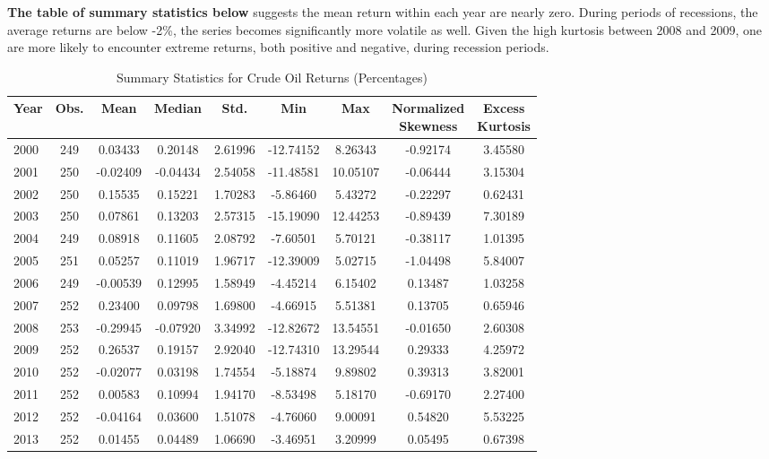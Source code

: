 \documentclass[12pt]{article}
\begin{document}
	\par \textbf{The table of summary statistics below} suggests the mean return within each year are nearly zero. During periods of recessions, the average returns are below -2\%, the series becomes significantly more volatile as well. Given the high kurtosis between 2008 and 2009, one are more likely to encounter extreme returns, both positive and negative, during recession periods.
	\begin{table}[H]
		\small
		\centering
		\caption{Summary Statistics for Crude Oil Returns (Percentages)}
		\begin{tabular}{l|c c c c c c c c}
			\toprule
Year & Obs. & Mean & Median & Std. & Min & Max & \shortstack{Normalized \\Skewness} & \shortstack{Excess \\Kurtosis} \\
			\midrule
2000 & 249 & 0.03433 & 0.20148 & 2.61996 & -12.74152 & 8.26343 & -0.92174 & 3.45580 \\
2001 & 250 & -0.02409 & -0.04434 & 2.54058 & -11.48581 & 10.05107 & -0.06444 & 3.15304 \\
2002 & 250 & 0.15535 & 0.15221 & 1.70283 & -5.86460 & 5.43272 & -0.22297 & 0.62431 \\
2003 & 250 & 0.07861 & 0.13203 & 2.57315 & -15.19090 & 12.44253 & -0.89439 & 7.30189 \\
2004 & 249 & 0.08918 & 0.11605 & 2.08792 & -7.60501 & 5.70121 & -0.38117 & 1.01395 \\
2005 & 251 & 0.05257 & 0.11019 & 1.96717 & -12.39009 & 5.02715 & -1.04498 & 5.84007 \\
2006 & 249 & -0.00539 & 0.12995 & 1.58949 & -4.45214 & 6.15402 & 0.13487 & 1.03258 \\
2007 & 252 & 0.23400 & 0.09798 & 1.69800 & -4.66915 & 5.51381 & 0.13705 & 0.65946 \\
2008 & 253 & -0.29945 & -0.07920 & 3.34992 & -12.82672 & 13.54551 & -0.01650 & 2.60308 \\
2009 & 252 & 0.26537 & 0.19157 & 2.92040 & -12.74310 & 13.29544 & 0.29333 & 4.25972 \\
2010 & 252 & -0.02077 & 0.03198 & 1.74554 & -5.18874 & 9.89802 & 0.39313 & 3.82001 \\
2011 & 252 & 0.00583 & 0.10994 & 1.94170 & -8.53498 & 5.18170 & -0.69170 & 2.27400 \\
2012 & 252 & -0.04164 & 0.03600 & 1.51078 & -4.76060 & 9.00091 & 0.54820 & 5.53225 \\
2013 & 252 & 0.01455 & 0.04489 & 1.06690 & -3.46951 & 3.20999 & 0.05495 & 0.67398 \\

\end{tabular}
\end{table}
\end{document}
